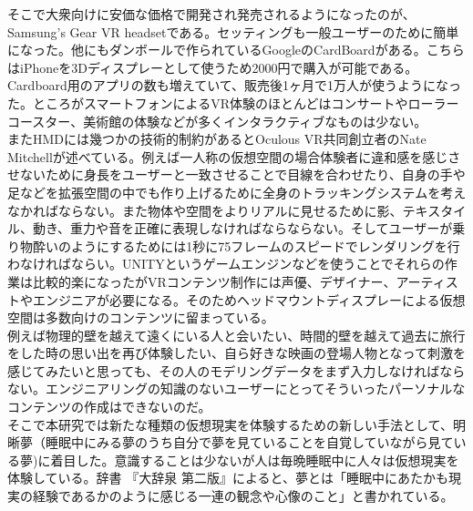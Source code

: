 そこで大衆向けに安価な価格で開発され発売されるようになったのが、Samsung's Gear VR headsetである\cite{samsung}。セッティングも一般ユーザーのために簡単になった。他にもダンボールで作られているGoogleのCardBoardがある。こちらはiPhoneを3Dディスプレーとして使うため2000円で購入が可能である。Cardboard用のアプリの数も増えていて、販売後1ヶ月で1万人が使うようになった\cite{cardboard}。ところがスマートフォンによるVR体験のほとんどはコンサートやローラーコースター、美術館の体験などが多くインタラクティブなものは少ない。\\

またHMDには幾つかの技術的制約があるとOculous VR共同創立者のNate Mitchellが述べている\cite{oculus}。例えば一人称の仮想空間の場合体験者に違和感を感じさせないために身長をユーザーと一致させることで目線を合わせたり、自身の手や足などを拡張空間の中でも作り上げるために全身のトラッキングシステムを考えなかればならない。また物体や空間をよりリアルに見せるために影、テキスタイル、動き、重力や音を正確に表現しなければならならない\cite{vrtrendShiny}。そしてユーザーが乗り物酔いのようにするためには1秒に75フレームのスピードでレンダリングを行わなければならい\cite{HMDifficulties}。UNITYというゲームエンジンなどを使うことでそれらの作業は比較的楽になったがVRコンテンツ制作には声優、デザイナー、アーティストやエンジニアが必要になる。そのためヘッドマウントディスプレーによる仮想空間は多数向けのコンテンツに留まっている。\\

例えば物理的壁を越えて遠くにいる人と会いたい、時間的壁を越えて過去に旅行をした時の思い出を再び体験したい、自ら好きな映画の登場人物となって刺激を感じてみたいと思っても、その人のモデリングデータをまず入力しなければならない。エンジニアリングの知識のないユーザーにとってそういったパーソナルなコンテンツの作成はできないのだ。\\

そこで本研究では新たな種類の仮想現実を体験するための新しい手法として、明晰夢（睡眠中にみる夢のうち自分で夢を見ていることを自覚していながら見ている夢)に着目した。意識することは少ないが人は毎晩睡眠中に人々は仮想現実を体験している。辞書 『大辞泉 第二版』によると、夢とは「睡眠中にあたかも現実の経験であるかのように感じる一連の観念や心像のこと」\cite{dream}と書かれている。\\

